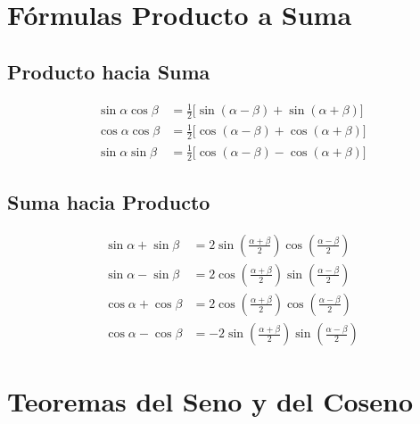 \documentclass[12pt,a4paper]{article}
\begin{document}
\section{Fórmulas Producto a Suma}

\subsection{Producto hacia Suma}

\begin{tcolorbox}[formulabox]
\begin{align*}
\sin\alpha\cos\beta &= \tfrac{1}{2}\bigl[\sin(\alpha-\beta)+\sin(\alpha+\beta)\bigr] \\[6pt]
\cos\alpha\cos\beta &= \tfrac{1}{2}\bigl[\cos(\alpha-\beta)+\cos(\alpha+\beta)\bigr] \\[6pt]
\sin\alpha\sin\beta &= \tfrac{1}{2}\bigl[\cos(\alpha-\beta)-\cos(\alpha+\beta)\bigr]
\end{align*}
\end{tcolorbox}

\subsection{Suma hacia Producto}

\begin{tcolorbox}[formulabox]
\begin{align*}
\sin\alpha+\sin\beta &= 2\sin\!\left(\frac{\alpha+\beta}{2}\right)
                         \cos\!\left(\frac{\alpha-\beta}{2}\right) \\[8pt]
\sin\alpha-\sin\beta &= 2\cos\!\left(\frac{\alpha+\beta}{2}\right)
                         \sin\!\left(\frac{\alpha-\beta}{2}\right) \\[8pt]
\cos\alpha+\cos\beta &= 2\cos\!\left(\frac{\alpha+\beta}{2}\right)
                         \cos\!\left(\frac{\alpha-\beta}{2}\right) \\[8pt]
\cos\alpha-\cos\beta &= -2\sin\!\left(\frac{\alpha+\beta}{2}\right)
                          \sin\!\left(\frac{\alpha-\beta}{2}\right)
\end{align*}
\end{tcolorbox}

\newpage

\section{Teoremas del Seno y del Coseno}
\end{document}
